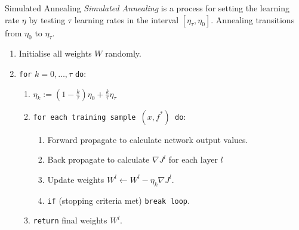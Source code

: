 \documentclass[11pt,a4paper]{article}
\begin{document}
  \begin{definition}{Simulated Annealing}
    \textit{Simulated Annealing} is a process for setting the learning rate $\eta$ by testing $\tau$ learning rates in the interval $[\eta_\tau,\eta_0]$. Annealing transitions from $\eta_0$ to $\eta_\tau$.
    \begin{enumerate}
      \item Initialise all weights $W$ randomly.
      \item \texttt{for} $k=0,\dots,\tau$ \texttt{do}:
      \begin{enumerate}
        \item $\eta_k:=\left(1-\frac{k}\tau\right)\eta_0+\frac{k}\tau\eta_\tau$
        \item \texttt{for each training sample $(x,f^*)$ do}:
        \begin{enumerate}
          \item Forward propagate to calculate network output values.
          \item Back propagate to calculate $\nabla J^l$ for each layer $l$
          \item Update weights $W^l\leftarrow W^l-\eta_k\nabla J^l$.
          \item \texttt{if} (stopping criteria met) \texttt{break loop}.
        \end{enumerate}
        \item \texttt{return} final weights $W^l$.
      \end{enumerate}
    \end{enumerate}
  \end{definition}
\end{document}
